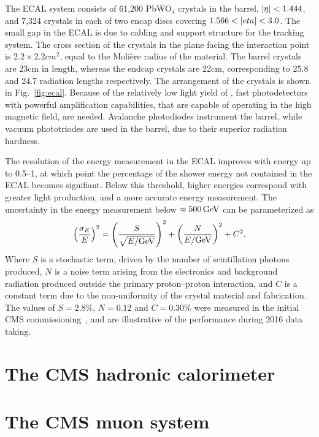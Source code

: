 The ECAL system consists of 61,200 PbWO$_4$ crystals in the barrel, $\lvert \eta \rvert < 1.444$,
and 7,324 crystals in each of two encap discs covering $1.566 < \lvert eta \rvert < 3.0$.
The small gap in the ECAL is due to cabling and support structure for the tracking system.
The cross section of the crystals in the plane facing the interaction point is $2.2\times2.2\unit{cm}^2$,
equal to the Moli{\`e}re radius of the material. The barrel crystals are 23\unit{cm} in
length, whereas the endcap crystals are 22\unit{cm}, corresponding to 
25.8 and 24.7 radiation lengths respectively. The arrangement of the crystals is shown in Fig.~\ref{fig:ecal}.
Because of the relatively low light yield of {\PbT}, fast photodetectors with
powerful amplification capabilities, that are capable of operating in the high magnetic
field, are needed. Avalanche photodiodes instrument the barrel, while vacuum phototriodes
are used in the barrel, due to their superior radiation hardness.

The resolution of the energy measurement in the ECAL improves with energy up to 
0.5--1\TeV, at which point the percentage of the shower energy not contained in the ECAL becomes
signifiant. Below this threshold, higher energies correspond with greater light production,
and a more accurate energy measurement. The uncertainty in the energy measurement
below $\approx500\,\text{Ge\hspace{-.08em}V}$ can be parameterized as
\begin{equation}
  \left(\frac{\sigma_E}{E}\right)^2 = \left(\frac{S}{\sqrt{E/\text{Ge\hspace{-.08em}V}}}\right)^2 + \left(\frac{N}{E/\text{Ge\hspace{-.08em}V}}\right)^2 + C^2.
\end{equation}
Where $S$ is a stochastic term, driven by the number of scintillation photons produced,
$N$ is a noise term arising from the electronics and background radiation produced
outside the primary proton--proton interaction, and $C$ is a constant term due to
the non-uniformity of the crystal material and fabrication.
The values of $S=2.8\%$, $N=0.12$ and $C=0.30\%$ were measured in the initial 
CMS commissioning~\cite{Chatrchyan:2008aa}, 
and are illustrative of the performance during 2016 data taking.

\section{The CMS hadronic calorimeter}


\section{The CMS muon system}

